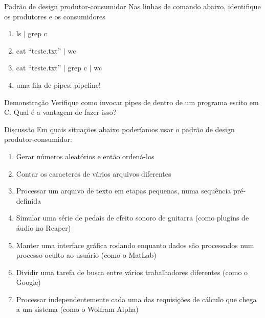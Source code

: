 \documentclass{beamer}
\begin{document}
\begin{frame}[fragile]{Padrão de design produtor-consumidor}
  \centering
  \large
  Nas linhas de comando abaixo, identifique os produtores e os consumidores
  \begin{enumerate}
    \item ls $|$ grep c
    \item cat ``teste.txt'' $|$ wc
    \item cat ``teste.txt'' $|$ grep c $|$ wc
    \item <2-> uma fila de pipes: pipeline!
  \end{enumerate}

\end{frame}

\begin{frame}[fragile]{Demonstração}
  \centering
  \Large
  Verifique como invocar pipes de dentro de um programa escito em C. Qual é a
  vantagem de fazer isso?
\end{frame}

\begin{frame}[fragile]{Discussão}
  \centering
  \large
  Em quais situações abaixo poderíamos usar o padrão de design produtor-consumidor:
  \begin{enumerate}
    \item Gerar números aleatórios e então ordená-los
    \item Contar os caracteres de vários arquivos diferentes
    \item Processar um arquivo de texto em etapas pequenas, numa sequência
      pré-definida
    \item Simular uma série de pedais de efeito sonoro de guitarra (como plugins
      de áudio no Reaper)
    \item Manter uma interface gráfica rodando enquanto dados são processados
      num processo oculto ao usuário (como o MatLab)
    \item Dividir uma tarefa de busca entre vários trabalhadores diferentes
      (como o Google)
    \item Processar independentemente cada uma das requisições de cálculo que
      chega a um sistema (como o Wolfram Alpha)
  \end{enumerate}

\end{frame}
\end{document}
